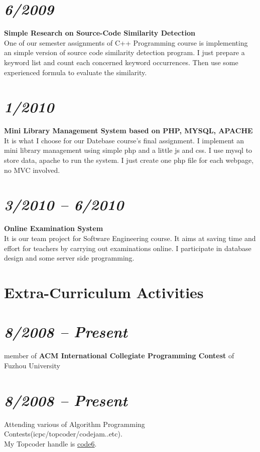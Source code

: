 \documentclass[margin,line]{res}
\newcommand{\ressection}[1]{
    {\colorbox{bg}{\fontfamily{phv}\selectfont\large#1}}
}
\begin{document}
\begin{resume}
\section{\em 6/2009}
\textbf{Simple Research on Source-Code Similarity Detection}\\
One of our semester assignments of C++ Programming course is implementing
an simple version of source code similarity detection program. I just prepare a keyword list and count each concerned keyword occurrences.
Then use some experienced formula to evaluate the similarity.

\section{\em 1/2010}
\textbf{Mini Library Management System based on PHP, MYSQL, APACHE}\\
It is what I choose for our Datebase course's final assignment. I implement an mini library
management using simple php and a little js and css. I use mysql to store data, apache to run the system.
I just create one php file for each webpage, no MVC involved.

\section{\em 3/2010 -- 6/2010}
\textbf{Online Examination System}\\
It is our team project for Software Engineering course. It aims at saving time and effort for teachers by carrying out examinations online.
I participate in database design and some server side programming.

\section{\ressection{Extra-Curriculum Activities}}
\vspace{5mm}
\section{\em 8/2008 -- Present} member of \textbf{ACM International Collegiate
Programming Contest} of Fuzhou University\vspace{-5mm}
\section{\em 8/2008 -- Present} Attending various of Algorithm Programming Contests(icpc/topcoder/codejam..etc).\\
 My Topcoder handle is \href{http://www.topcoder.com/tc?module=MemberProfile&cr=22758532}{code6}.\vspace{-5mm}

\end{resume}
\end{document}
